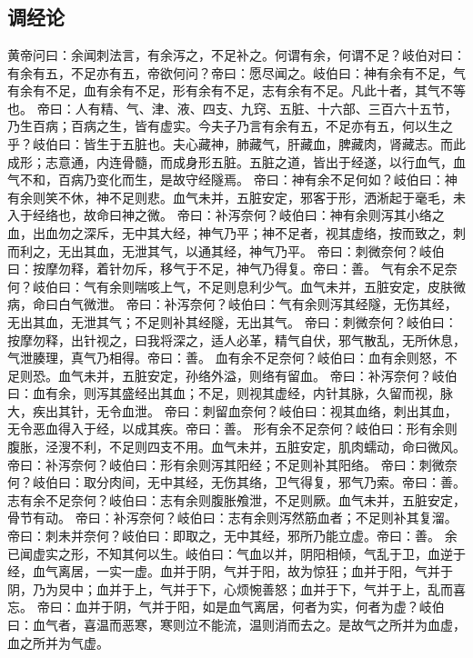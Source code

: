 \documentclass[a4paper,12pt,UTF8,twoside]{ctexbook}
\begin{document}
\part{}
\chapter{调经论}
黄帝问曰：余闻刺法言，有余泻之，不足补之。何谓有余，何谓不足？岐伯对曰：有余有五，不足亦有五，帝欲何问？帝曰：愿尽闻之。岐伯曰：神有余有不足，气有余有不足，血有余有不足，形有余有不足，志有余有不足。凡此十者，其气不等也。
帝曰：人有精、气、津、液、四支、九窍、五脏、十六部、三百六十五节，乃生百病；百病之生，皆有虚实。今夫子乃言有余有五，不足亦有五，何以生之乎？岐伯曰：皆生于五脏也。夫心藏神，肺藏气，肝藏血，脾藏肉，肾藏志。而此成形；志意通，内连骨髓，而成身形五脏。五脏之道，皆出于经遂，以行血气，血气不和，百病乃变化而生，是故守经隧焉。
帝曰：神有余不足何如？岐伯曰：神有余则笑不休，神不足则悲。血气未并，五脏安定，邪客于形，洒淅起于毫毛，未入于经络也，故命曰神之微。
帝曰：补泻奈何？岐伯曰：神有余则泻其小络之血，出血勿之深斥，无中其大经，神气乃平；神不足者，视其虚络，按而致之，刺而利之，无出其血，无泄其气，以通其经，神气乃平。
帝曰：刺微奈何？岐伯曰：按摩勿释，着针勿斥，移气于不足，神气乃得复。帝曰：善。
气有余不足奈何？岐伯曰：气有余则喘咳上气，不足则息利少气。血气未并，五脏安定，皮肤微病，命曰白气微泄。
帝曰：补泻奈何？岐伯曰：气有余则泻其经隧，无伤其经，无出其血，无泄其气；不足则补其经隧，无出其气。
帝曰：刺微奈何？岐伯曰：按摩勿释，出针视之，曰我将深之，适人必革，精气自伏，邪气散乱，无所休息，气泄腠理，真气乃相得。帝曰：善。
血有余不足奈何？岐伯曰：血有余则怒，不足则恐。血气未并，五脏安定，孙络外溢，则络有留血。
帝曰：补泻奈何？岐伯曰：血有余，则泻其盛经出其血；不足，则视其虚经，内针其脉，久留而视，脉大，疾出其针，无令血泄。
帝曰：刺留血奈何？岐伯曰：视其血络，刺出其血，无令恶血得入于经，以成其疾。帝曰：善。
形有余不足奈何？岐伯曰：形有余则腹胀，泾溲不利，不足则四支不用。血气未并，五脏安定，肌肉蠕动，命曰微风。
帝曰：补泻奈何？岐伯曰：形有余则泻其阳经；不足则补其阳络。
帝曰：刺微奈何？岐伯曰：取分肉间，无中其经，无伤其络，卫气得复，邪气乃索。帝曰：善。
志有余不足奈何？岐伯曰：志有余则腹胀飧泄，不足则厥。血气未并，五脏安定，骨节有动。
帝曰：补泻奈何？岐伯曰：志有余则泻然筋血者；不足则补其复溜。
帝曰：刺未并奈何？岐伯曰：即取之，无中其经，邪所乃能立虚。帝曰：善。
余已闻虚实之形，不知其何以生。岐伯曰：气血以并，阴阳相倾，气乱于卫，血逆于经，血气离居，一实一虚。血并于阴，气并于阳，故为惊狂；血并于阳，气并于阴，乃为炅中；血并于上，气并于下，心烦惋善怒；血并于下，气并于上，乱而喜忘。
帝曰：血并于阴，气并于阳，如是血气离居，何者为实，何者为虚？岐伯曰：血气者，喜温而恶寒，寒则泣不能流，温则消而去之。是故气之所并为血虚，血之所并为气虚。
\end{document}
